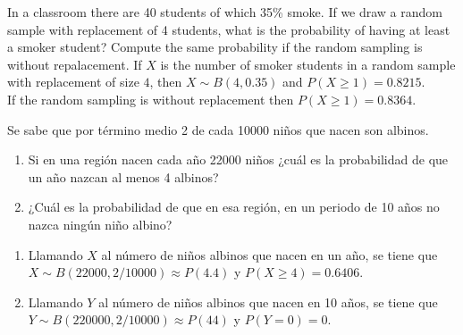 {In a classroom there are 40 students of which 35\% smoke.
If we draw a random sample with replacement of 4 students, what is the probability of having at least a smoker student?
Compute the same probability if the random sampling is without repalacement.}
{If $X$ is the number of smoker students in a random sample with replacement of size $4$, then $X\sim
B(4,0.35)$ and $P(X\geq 1)=0.8215$.\\
If the random sampling is without replacement then $P(X\geq 1)= 0.8364$.}
{}


{Se sabe que por término medio 2 de cada 10000 niños que nacen son albinos.
\begin{enumerate}
\item Si en una región nacen cada año 22000 niños ¿cuál es la probabilidad de que un año nazcan al menos 4 albinos?
\item ¿Cuál es la probabilidad de que en esa región, en un periodo de 10 años no nazca ningún niño albino?
\end{enumerate}
}
{
\begin{enumerate}
\item Llamando $X$ al número de niños albinos que nacen en un año, se tiene que $X\sim B(22000,2/10000)\approx
P(4.4)$ y $P(X\geq 4)=0.6406$.
\item Llamando $Y$ al número de niños albinos que nacen en 10 años, se tiene que $Y\sim B(220000,2/10000)\approx
P(44)$ y $P(Y=0)=0$.
\end{enumerate}
}
{}


